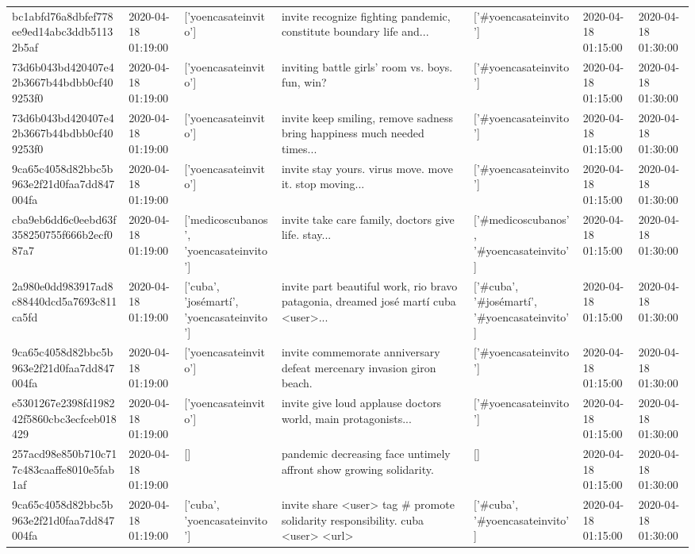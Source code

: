 \begin{tabular}{lllllll}
bc1abfd76a8dbfef778ee9ed14abc3ddb51132b5af & 2020-04-18 01:19:00 & ['yoencasateinvito'] & invite recognize fighting pandemic, constitute boundary life and... & ['#yoencasateinvito'] & 2020-04-18 01:15:00 & 2020-04-18 01:30:00 \\
73d6b043bd420407e42b3667b44bdbb0cf409253f0 & 2020-04-18 01:19:00 & ['yoencasateinvito'] & inviting battle girls' room vs. boys. fun, win? & ['#yoencasateinvito'] & 2020-04-18 01:15:00 & 2020-04-18 01:30:00 \\
73d6b043bd420407e42b3667b44bdbb0cf409253f0 & 2020-04-18 01:19:00 & ['yoencasateinvito'] & invite keep smiling, remove sadness bring happiness much needed times... & ['#yoencasateinvito'] & 2020-04-18 01:15:00 & 2020-04-18 01:30:00 \\
9ca65c4058d82bbc5b963e2f21d0faa7dd847004fa & 2020-04-18 01:19:00 & ['yoencasateinvito'] & invite stay yours. virus move. move it. stop moving... & ['#yoencasateinvito'] & 2020-04-18 01:15:00 & 2020-04-18 01:30:00 \\
cba9eb6dd6c0eebd63f358250755f666b2ecf087a7 & 2020-04-18 01:19:00 & ['medicoscubanos', 'yoencasateinvito'] & invite take care family, doctors give life. stay... & ['#medicoscubanos', '#yoencasateinvito'] & 2020-04-18 01:15:00 & 2020-04-18 01:30:00 \\
2a980e0dd983917ad8c88440dcd5a7693c811ca5fd & 2020-04-18 01:19:00 & ['cuba', 'josémartí', 'yoencasateinvito'] & invite part beautiful work, rio bravo patagonia, dreamed josé martí cuba <user>... & ['#cuba', '#josémartí', '#yoencasateinvito'] & 2020-04-18 01:15:00 & 2020-04-18 01:30:00 \\
9ca65c4058d82bbc5b963e2f21d0faa7dd847004fa & 2020-04-18 01:19:00 & ['yoencasateinvito'] & invite commemorate anniversary defeat mercenary invasion giron beach. & ['#yoencasateinvito'] & 2020-04-18 01:15:00 & 2020-04-18 01:30:00 \\
e5301267e2398fd198242f5860cbc3ecfceb018429 & 2020-04-18 01:19:00 & ['yoencasateinvito'] & invite give loud applause doctors world, main protagonists... & ['#yoencasateinvito'] & 2020-04-18 01:15:00 & 2020-04-18 01:30:00 \\
257acd98e850b710c717c483caaffe8010e5fab1af & 2020-04-18 01:19:00 & [] & pandemic decreasing face untimely affront show growing solidarity. & [] & 2020-04-18 01:15:00 & 2020-04-18 01:30:00 \\
9ca65c4058d82bbc5b963e2f21d0faa7dd847004fa & 2020-04-18 01:19:00 & ['cuba', 'yoencasateinvito'] & invite share <user> tag \# promote solidarity responsibility. cuba <user> <url> & ['#cuba', '#yoencasateinvito'] & 2020-04-18 01:15:00 & 2020-04-18 01:30:00 \\

\end{tabular}
